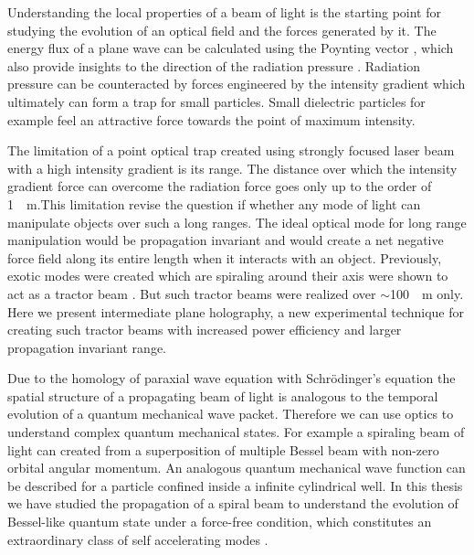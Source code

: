 Understanding the local properties of a beam of light is the starting point for studying the evolution of an optical field and the forces generated by it. The energy flux of a plane wave can be calculated using the Poynting vector \cite{jackson_classical_1999}, which also provide insights to the direction of the radiation pressure \cite{Ashkin1081, gordon1980, Nichols1903, Debye1909}. Radiation pressure can be counteracted by forces engineered by the intensity gradient which ultimately can form a trap for small particles. Small dielectric particles for example feel an attractive force towards the point of maximum intensity.


The limitation of a point optical trap created using strongly focused laser beam with a high intensity gradient is its range. The distance over which the intensity gradient force can overcome the radiation force goes only up to the order of \SI{1}{\mu m}.This limitation revise the question if whether any mode of light  can manipulate objects over such a long ranges. The ideal optical mode for long range manipulation would be propagation invariant  and would create a net negative force field along its entire length when it interacts with an object. Previously, exotic modes were created which are spiraling around their axis were shown to act as a tractor beam \cite{Lee_2010}. But such tractor beams were realized over $\sim$\SI{100}{\mu m} only. Here we present intermediate plane holography, a new experimental technique for creating such tractor beams with increased power efficiency and larger propagation invariant range.


Due to the homology of paraxial wave equation with Schr\"odinger's equation the spatial structure of a propagating beam of light is analogous to the temporal evolution of a quantum mechanical wave packet. Therefore we can use optics to understand complex quantum mechanical states. For example a spiraling beam of light can created from a superposition of multiple Bessel beam with non-zero orbital angular momentum. An analogous quantum mechanical wave function can be described for a particle confined inside a infinite cylindrical well. In this thesis we have studied the propagation of a spiral beam to understand the evolution of  Bessel-like quantum state under a force-free condition, which constitutes an extraordinary class of self accelerating modes \cite{Berry1979}.



